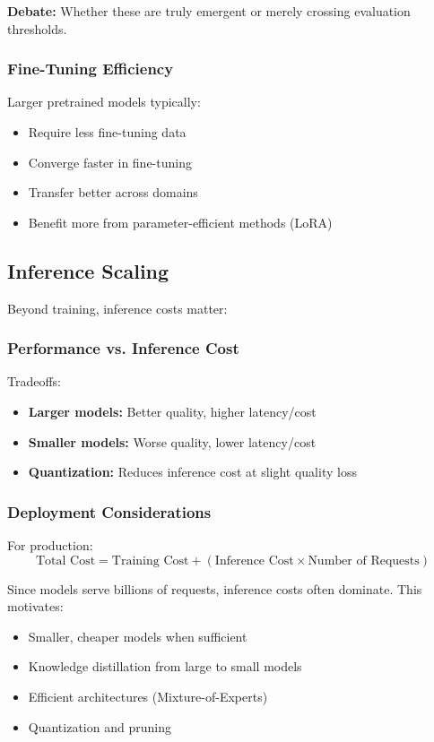 \documentclass[class=article,crop=false]{standalone}
\begin{document}
\textbf{Debate:} Whether these are truly emergent or merely crossing evaluation thresholds.

\subsubsection{Fine-Tuning Efficiency}

Larger pretrained models typically:
\begin{itemize}
  \item Require less fine-tuning data
  \item Converge faster in fine-tuning
  \item Transfer better across domains
  \item Benefit more from parameter-efficient methods (LoRA)
\end{itemize}

\subsection{Inference Scaling}
\label{sec:scaling:inference}

Beyond training, inference costs matter:

\subsubsection{Performance vs. Inference Cost}

Tradeoffs:
\begin{itemize}
  \item \textbf{Larger models:} Better quality, higher latency/cost
  \item \textbf{Smaller models:} Worse quality, lower latency/cost
  \item \textbf{Quantization:} Reduces inference cost at slight quality loss
\end{itemize}

\subsubsection{Deployment Considerations}

For production:
\begin{equation}
  \text{Total Cost} = \text{Training Cost} + (\text{Inference Cost} \times \text{Number of Requests})
\end{equation}

Since models serve billions of requests, inference costs often dominate. This motivates:
\begin{itemize}
  \item Smaller, cheaper models when sufficient
  \item Knowledge distillation from large to small models
  \item Efficient architectures (Mixture-of-Experts)
  \item Quantization and pruning
\end{itemize}
\end{document}
